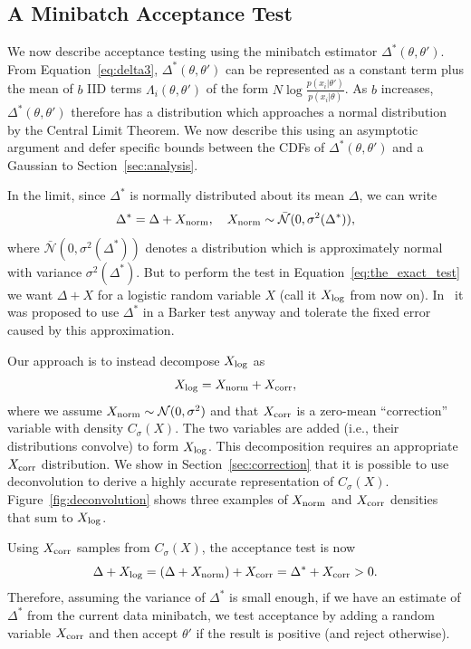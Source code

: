\documentclass{article}
\begin{document}
\subsection{A Minibatch Acceptance Test}\label{ssec:deltas_minibatch}

We now describe acceptance testing using the minibatch estimator
$\Delta^*(\theta,\theta')$. From Equation~\ref{eq:delta3},
$\Delta^*(\theta,\theta')$ can be represented as a constant term plus the mean
of $b$ IID terms $\Lambda_i(\theta,\theta')$ of the form
$N\log\frac{p(x_i|\theta')}{p(x_i|\theta)}$. As $b$ increases,
$\Delta^*(\theta,\theta')$ therefore has a distribution which approaches a
normal distribution by the Central Limit Theorem. We now describe this using an
asymptotic argument and defer specific bounds between the CDFs of
$\Delta^*(\theta,\theta')$ and a Gaussian to Section~\ref{sec:analysis}.

In the limit, since $\Delta^*$ is normally distributed about its mean $\Delta$,
we can write
\begin{equation}\label{eq:relationship}
    \Delta^* = \Delta + X_{\rm norm}, \quad X_{\rm norm} \sim \mathcal{\bar{N}}(0, \sigma^2(\Delta^*)),
\end{equation}
where $\mathcal{\bar{N}}(0, \sigma^2(\Delta^*))$ denotes a distribution which is
approximately normal with variance $\sigma^2(\Delta^*)$.  But to perform the
test in Equation~\ref{eq:the_exact_test} we want $\Delta + X$ for a logistic
random variable $X$ (call it $X_{\rm log}$ from now on). In~\cite{Bardenet15} it
was proposed to use $\Delta^*$ in a Barker test anyway and tolerate the fixed
error caused by this approximation. 

Our approach is to instead decompose $X_{\rm log}$ as
\begin{equation}\label{eq:deconvolution}
    X_{\rm log} = X_{\rm norm}+X_{\rm corr},
\end{equation}
where we assume $X_{\rm norm} \sim \mathcal{N}(0, \sigma^2)$ and that $X_{\rm
corr}$ is a zero-mean ``correction'' variable with density $C_{\sigma}(X)$.  The
two variables are added (i.e., their distributions convolve) to form $X_{\rm
log}$.  This decomposition requires an appropriate $X_{\rm corr}$ distribution.
We show in Section~\ref{sec:correction} that it is possible to use deconvolution
to derive a highly accurate representation of $C_\sigma(X)$.
Figure~\ref{fig:deconvolution} shows three examples of $X_{\rm norm}$ and
$X_{\rm corr}$ densities that sum to $X_{\rm log}$.

Using $X_{\rm corr}$ samples from $C_\sigma(X)$, the acceptance test is now
\begin{equation}\label{eq:criteria}
    \Delta + X_{\rm log} = (\Delta + X_{\rm norm}) + X_{\rm corr} = \Delta^* + X_{\rm corr} >0.
\end{equation}
Therefore, assuming the variance of $\Delta^*$ is small enough, if we have an
estimate of $\Delta^*$ from the current data minibatch, we test acceptance by
adding a random variable $X_{\rm corr}$ and then accept $\theta'$ if the result
is positive (and reject otherwise).
\end{document}
